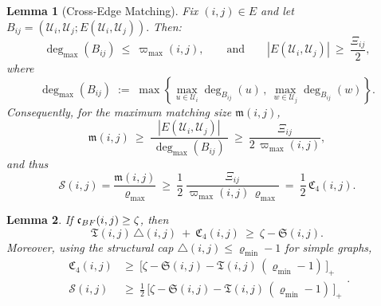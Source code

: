 \documentclass[10pt,a4paper]{amsart}
\newtheorem{lemma}{Lemma}
\begin{document}
\begin{lemma}[Cross-Edge Matching]
\label{lem:matching-from-C4-rigorous}
Fix $(i,j)\in E$ and let 
\(
B_{ij}=(\mathcal U_i,\mathcal U_j;E(\mathcal U_i,\mathcal U_j)).
\)
Then:
\begin{equation}
\label{eq:Delta-max-UB}
\operatorname{deg}_{\max}(B_{ij})\ \le\ \varpi_{\max}(i,j),
\qquad
\text{and}\qquad
|E(\mathcal U_i,\mathcal U_j)|\ \ge\ \frac{\Xi_{ij}}{2},
\end{equation}
where
\[
\operatorname{deg}_{\max}(B_{ij})
\;:=\;
\max\!\left\{
\max_{u\in\mathcal U_i}\deg_{B_{ij}}(u)\,,\ 
\max_{w\in\mathcal U_j}\deg_{B_{ij}}(w)
\right\}.
\]
Consequently, for the maximum matching size $\mathfrak m(i,j)$,
\begin{equation}
\label{eq:m-lb}
\mathfrak m(i,j)\ \ge\ \frac{|E(\mathcal U_i,\mathcal U_j)|}{\ \operatorname{deg}_{\max}(B_{ij})\ }\ \ge\ \frac{\Xi_{ij}}{2\,\varpi_{\max}(i,j)},
\end{equation}
and thus
\begin{equation}
\label{eq:S-lb-by-C4}
\mathscr S(i,j)=\frac{\mathfrak m(i,j)}{\varrho_{\max}}\ \ge\ \frac12\,\frac{\Xi_{ij}}{\varpi_{\max}(i,j)\,\varrho_{\max}}\ =\ \frac12\,\mathfrak C_4(i,j).
\end{equation}
\end{lemma}

\begin{lemma}
\label{lem:leftover-rigorous}
If $\mathfrak c_{\rm BF}(i,j)\ge \zeta$, then
\begin{equation}
\label{eq:budget}
\mathfrak T(i,j)\,\triangle(i,j)\ +\ \mathfrak C_4(i,j)\ \ge\ \zeta-\mathfrak S(i,j).
\end{equation}
Moreover, using the structural cap $\triangle(i,j)\le \varrho_{\min}-1$ for simple graphs,
\begin{equation}
\label{eq:C4-leftover-rigorous}
\begin{aligned} 
\mathfrak C_4(i,j)& \ge\ \bigl[\zeta-\mathfrak S(i,j)-\mathfrak T(i,j)\,(\varrho_{\min}-1)\,\bigr]_+
\\
\mathscr S(i,j)& \ge\ \frac12\,\bigl[\zeta-\mathfrak S(i,j)-\mathfrak T(i,j)\,(\varrho_{\min}-1)\,\bigr]_+
\end{aligned}.
\end{equation}
\end{lemma}
\end{document}

